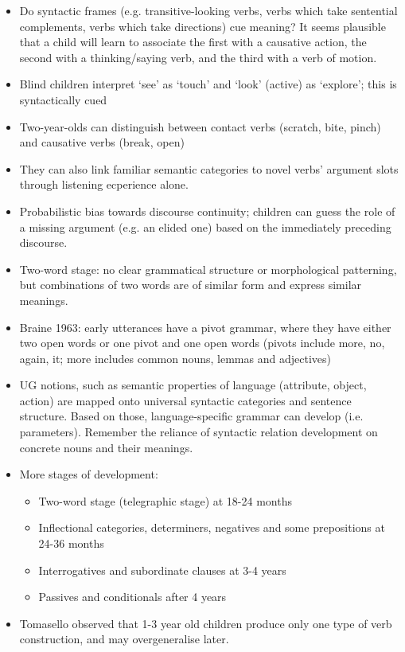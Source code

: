 \documentclass{article}
\begin{document}
\begin{itemize}
    \item Do syntactic frames (e.g. transitive-looking verbs, verbs which take sentential complements, verbs which take directions) cue meaning? It seems plausible that a child will learn to associate the first with a causative action, the second with a thinking/saying verb, and the third with a verb of motion.
    \item Blind children interpret `see' as `touch' and `look' (active) as `explore'; this is syntactically cued 
    \item Two-year-olds can distinguish between contact verbs (scratch, bite, pinch) and causative verbs (break, open)
    \item They can also link familiar semantic categories to novel verbs' argument slots through listening ecperience alone.
    \item Probabilistic bias towards discourse continuity; children can guess the role of a missing argument (e.g. an elided one) based on the immediately preceding discourse.
    \item Two-word stage: no clear grammatical structure or morphological patterning, but combinations of two words are of similar form and express similar meanings.
    \item Braine 1963: early utterances have a pivot grammar, where they have either two open words or one pivot and one open words (pivots include more, no, again, it; more includes common nouns, lemmas and adjectives)
    \item UG notions, such as semantic properties of language (attribute, object, action) are mapped onto universal syntactic categories and sentence structure. Based on those, language-specific grammar can develop (i.e. parameters). Remember the reliance of syntactic relation development on concrete nouns and their meanings.
    \item More stages of development:
    \begin{itemize}
        \item Two-word stage (telegraphic stage) at 18-24 months
        \item Inflectional categories, determiners, negatives and some prepositions at 24-36 months
        \item Interrogatives and subordinate clauses at 3-4 years
        \item Passives and conditionals after 4 years
    \end{itemize}
    \item Tomasello observed that 1-3 year old children produce only one type of verb construction, and may overgeneralise later.

\end{itemize}
\end{document}
